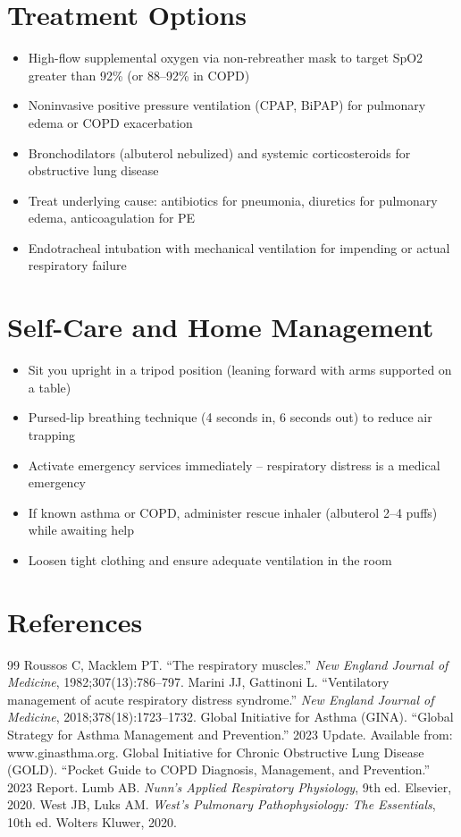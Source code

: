 \section*{Treatment Options}
\begin{itemize}
  \item High-flow supplemental oxygen via non-rebreather mask to target SpO2 greater than 92\% (or 88--92\% in COPD)
  \item Noninvasive positive pressure ventilation (CPAP, BiPAP) for pulmonary edema or COPD exacerbation
  \item Bronchodilators (albuterol nebulized) and systemic corticosteroids for obstructive lung disease
  \item Treat underlying cause: antibiotics for pneumonia, diuretics for pulmonary edema, anticoagulation for PE
  \item Endotracheal intubation with mechanical ventilation for impending or actual respiratory failure
\end{itemize}

\section*{Self-Care and Home Management}
\begin{itemize}
  \item Sit you upright in a tripod position (leaning forward with arms supported on a table)
  \item Pursed-lip breathing technique (4 seconds in, 6 seconds out) to reduce air trapping
  \item Activate emergency services immediately -- respiratory distress is a medical emergency
  \item If known asthma or COPD, administer rescue inhaler (albuterol 2--4 puffs) while awaiting help
  \item Loosen tight clothing and ensure adequate ventilation in the room
\end{itemize}

\section*{References}
\begin{thebibliography}{99}
 Roussos C, Macklem PT. ``The respiratory muscles.'' \textit{New England Journal of Medicine}, 1982;307(13):786--797.
 Marini JJ, Gattinoni L. ``Ventilatory management of acute respiratory distress syndrome.'' \textit{New England Journal of Medicine}, 2018;378(18):1723--1732.
 Global Initiative for Asthma (GINA). ``Global Strategy for Asthma Management and Prevention.'' 2023 Update. Available from: www.ginasthma.org.
 Global Initiative for Chronic Obstructive Lung Disease (GOLD). ``Pocket Guide to COPD Diagnosis, Management, and Prevention.'' 2023 Report.
 Lumb AB. \textit{Nunn's Applied Respiratory Physiology}, 9th ed. Elsevier, 2020.
 West JB, Luks AM. \textit{West's Pulmonary Pathophysiology: The Essentials}, 10th ed. Wolters Kluwer, 2020.
\end{thebibliography}
